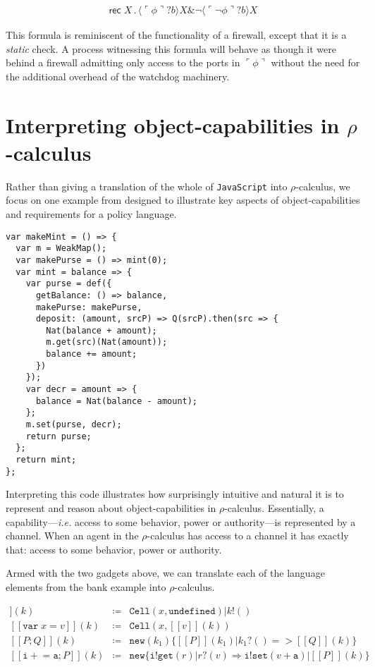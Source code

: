 \documentclass[]{amsart}
\newcommand{\ldb}{[\![}
\newcommand{\rdb}{]\!]}
\newcommand{\lpquote}{\ulcorner}
\newcommand{\rpquote}{\urcorner}
\newcommand{\id}[1]{\texttt{#1}}
\newcommand{\juxtap}{\mathbin{\id{|}}}
\newcommand{\binpar}[2]{#1 \juxtap #2}
\newcommand{\meaningof}[1]{\ldb #1 \rdb}
\newcommand{\defneqls}{\coloneqq}
\newcommand{\pquotep}[1]{\lpquote #1 \rpquote}
\newcommand{\pprefix}[3]{\langle #1 ? #2 \rangle #3}
\newcommand{\pgfp}[2]{\textsf{rec} \; #1 \mathbin{.} #2}
\theoremstyle{definition}
\theoremstyle{remark}
\numberwithin{equation}{subsection}
\newcommand{\rhoc}{$\rho$-calculus}
\begin{document}
\begin{eqnarray}
  \pgfp{X}{\pprefix{\pquotep{\phi}}{b}{X} \& \neg \pprefix{\pquotep{\neg \phi}}{b}{X}} \nonumber
\end{eqnarray} 

This formula is reminiscent of the functionality of a firewall, except
that it is a \emph{static} check. A process witnessing this formula
will behave as though it were behind a firewall admitting only access
to the ports in $\pquotep{\phi}$ without the need for the additional
overhead of the watchdog machinery.

\section{Interpreting object-capabilities in \rhoc}

Rather than giving a translation of the whole of {\tt JavaScript} into
\rhoc, we focus on one example from
\cite{Drossopoulou:2013:NCP:2489804.2489811} designed to illustrate
key aspects of object-capabilities and requirements for a policy
language.

\begin{verbatim}
var makeMint = () => {
  var m = WeakMap();
  var makePurse = () => mint(0);
  var mint = balance => {
    var purse = def({
      getBalance: () => balance,
      makePurse: makePurse,
      deposit: (amount, srcP) => Q(srcP).then(src => {
        Nat(balance + amount);
        m.get(src)(Nat(amount));
        balance += amount;
      })
    });
    var decr = amount => {
      balance = Nat(balance - amount);
    };
    m.set(purse, decr);
    return purse;
  };
  return mint;
};
\end{verbatim}

Interpreting this code illustrates how surprisingly intuitive and
natural it is to represent and reason about object-capabilities in
\rhoc. Essentially, a capability---{\em i.e.} access to some behavior, power
or authority---is represented by a channel. When an agent in the \rhoc
has access to a channel it has exactly that: access to some behavior,
power or authority.


Armed with the two gadgets above, we can translate each of the language elements from the bank example into \rhoc.

\begin{eqnarray*}
 \meaningof{\texttt{var}\; x}( k ) & \defneqls & \binpar{\texttt{Cell}( x, \texttt{undefined} )}{k!()} \\
 \meaningof{\texttt{var}\; x = v}( k ) & \defneqls & \texttt{Cell}( x, \meaningof{ v }( k ) ) \\
 \meaningof{ P ; Q }( k ) & \defneqls & \texttt{new}(k_1)\{ \binpar{\meaningof{ P }( k_1 )}{ k_1?() => \meaningof{ Q }( k )} \} \\
 \meaningof{ \texttt{i} +\!= \texttt{a} ; P }( k ) & \defneqls & \texttt{new} \{ \binpar{\binpar{\texttt{i} ! \texttt{get}( r )}{r?( v ) \Rightarrow \texttt{i}! \texttt{set}( v + \texttt{a} ) }}{\meaningof{P}( k )} \}\\
\end{eqnarray*}
\end{document}
